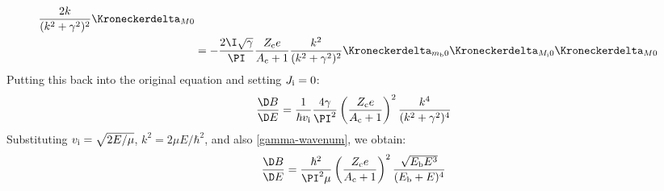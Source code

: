 \documentclass[fleqn, 12pt]{article}
\begin{document}
\begin{enumerate}
\begin{align*}
      \frac{2 k}{(k^2 + \gamma^2)^2} \Kroneckerdelta_{M 0} \\
    &= -\frac{2 \I \sqrt{\gamma}}{\PI}
      \frac{Z_{\text c} e}{A_{\text c} + 1}
      \frac{k^2}{(k^2 + \gamma^2)^2}
      \Kroneckerdelta_{m_{\text b} 0}
      \Kroneckerdelta_{M_{\text i} 0}
      \Kroneckerdelta_{M 0}
  \end{align*}
  Putting this back into the original equation and setting $J_{\text i} = 0$:
  \begin{align*}
    \frac{\D B}{\D E} =
    \frac{1}{\hbar v_{\text i}}
    \frac{4 \gamma}{\PI^2}
    \left(\frac{Z_{\text c} e}{A_{\text c} + 1}\right)^2
    \frac{k^4}{(k^2 + \gamma^2)^4}
  \end{align*}
  Substituting $v_{\text i} = \sqrt{2 E / \mu}$, $k^2 = 2 \mu E / \hbar^2$,
  and also \eqref{gamma-wavenum}, we obtain:
  \begin{align*}
    \frac{\D B}{\D E} =
    \frac{\hbar^2}{\PI^2 \mu}
    \left(\frac{Z_{\text c} e}{A_{\text c} + 1}\right)^2
    \frac{\sqrt{E_{\text b} E^3}}{(E_{\text b} + E)^4}
  \end{align*}


\end{enumerate}
\end{document}
